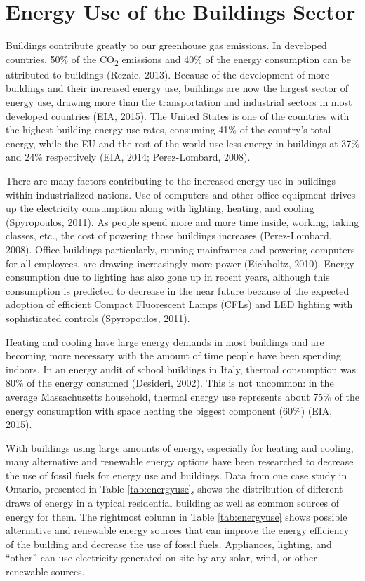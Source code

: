   \section{Energy Use of the Buildings Sector}
  \par Buildings contribute greatly to our greenhouse gas emissions. In developed countries, 50\% of the CO\textsubscript{2} emissions and 40\% of the energy consumption can be attributed to buildings (Rezaie, 2013). Because of the development of more buildings and their increased energy use, buildings are now the largest sector of energy use, drawing more than the transportation and industrial sectors in most developed countries (EIA, 2015). The United States is one of the countries with the highest building energy use rates, consuming 41\% of the country's total energy, while the EU and the rest of the world use less energy in buildings at 37\% and 24\% respectively (EIA, 2014; Perez-Lombard, 2008). 
  \par There are many factors contributing to the increased energy use in buildings within industrialized nations. Use of computers and other office equipment drives up the electricity consumption along with lighting, heating, and cooling (Spyropoulos, 2011). As people spend more and more time inside, working, taking classes, etc., the cost of powering those buildings increases (Perez-Lombard, 2008). Office buildings particularly, running mainframes and powering computers for all employees, are drawing increasingly more power (Eichholtz, 2010). Energy consumption due to lighting has also gone up in recent years, although this consumption is predicted to decrease in the near future because of the expected adoption of efficient Compact Fluorescent Lamps (CFLs) and LED lighting with sophisticated controls (Spyropoulos, 2011).
  \par Heating and cooling have large energy demands in most buildings and are becoming more necessary with the amount of time people have been spending indoors. In an energy audit of school buildings in Italy, thermal consumption was 80\% of the energy consumed (Desideri, 2002). This is not uncommon: in the average Massachusetts household, thermal energy use represents about 75\% of the energy consumption with space heating the biggest component (60\%) (EIA, 2015).
  \par With buildings using large amounts of energy, especially for heating and cooling, many alternative and renewable energy options have been researched to decrease the use of fossil fuels for energy use and buildings. Data from one case study in Ontario, presented in Table \ref{tab:energyuse}, shows the distribution of different draws of energy in a typical residential building as well as common sources of energy for them. The rightmost column in Table \ref{tab:energyuse} shows possible alternative and renewable energy sources that can improve the energy efficiency of the building and decrease the use of fossil fuels. Appliances, lighting, and “other” can use electricity generated on site by any solar, wind, or other renewable sources.
